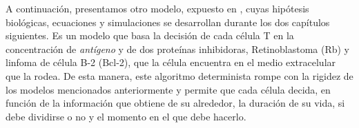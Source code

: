 A continuación, presentamos otro modelo, expuesto en \cite{JTB}, cuyas hipótesis biológicas, ecuaciones y simulaciones se desarrollan durante los dos capítulos siguientes. Es un modelo que basa la decisión de cada célula T en la concentración de \textit{antígeno} y de dos proteínas inhibidoras, Retinoblastoma (Rb) y linfoma de célula B-2 (Bcl-2), que la célula encuentra en el medio extracelular que la rodea. De esta manera, este algoritmo determinista rompe con la rigidez de los modelos mencionados anteriormente y permite que cada célula decida, en función de la información que obtiene de su alrededor, la duración de su vida, si debe dividirse o no y el momento en el que debe hacerlo. 


